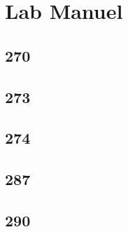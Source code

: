 \documentclass{article}
\begin{document}
\section{Lab Manuel}

\subsection{270}

\subsection{273}

\subsection{274}

\subsection{287}

\subsection{290}
\end{document}
